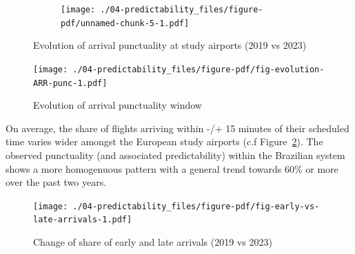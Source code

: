 \documentclass[
  a4paper,
  DIV=11,
  numbers=noendperiod]{scrreport}
\begin{document}
\begin{figure}

\begin{minipage}[t]{\linewidth}

{\centering 

\begin{figure}[H]

{\centering \texttt{[image: ./04-predictability\_files/figure-pdf/unnamed-chunk-5-1.pdf]}

}

\end{figure}

}

\end{minipage}%

\caption{\label{fig-arrival-punc}Evolution of arrival punctuality at
study airports (2019 vs 2023)}

\end{figure}

\begin{figure}[H]

{\centering \texttt{[image: ./04-predictability\_files/figure-pdf/fig-evolution-ARR-punc-1.pdf]}

}

\caption{\label{fig-evolution-ARR-punc}Evolution of arrival punctuality
window}

\end{figure}

On average, the share of flights arriving within -/+ 15 minutes of their
scheduled time varies wider amongst the European study airports (c.f
Figure~\ref{fig-evolution-ARR-punc}). The observed punctuality (and
associated predictability) within the Brazilian system shows a more
homogenuous pattern with a general trend towards 60\% or more over the
past two years.

\begin{figure}[H]

{\centering \texttt{[image: ./04-predictability\_files/figure-pdf/fig-early-vs-late-arrivals-1.pdf]}

}

\caption{\label{fig-early-vs-late-arrivals}Change of share of early and
late arrivals (2019 vs 2023)}

\end{figure}
\end{document}
